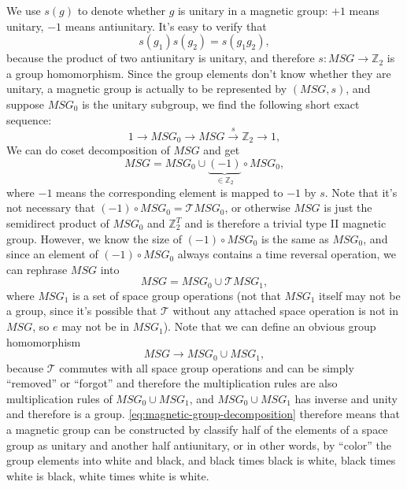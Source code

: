 \documentclass[hyperref, a4paper]{article}
\begin{document}
We use $s(g)$ to denote whether $g$ is unitary in a magnetic group: $+1$ means unitary, $-1$ means antiunitary.
It's easy to verify that 
\begin{equation}
    s(g_1) s(g_2) = s(g_1 g_2),
\end{equation}
because the product of two antiunitary is unitary, and therefore $s: MSG \to \mathbb{Z}_2$ is a 
group homomorphism. Since the group elements don't know whether they are unitary, a magnetic group 
is actually to be represented by $(MSG, s)$, and suppose $MSG_0$ is the unitary subgroup, 
we find the following short exact sequence: 
\begin{equation}
    1 \to MSG_0 \to MSG \stackrel{s}{\to} \mathbb{Z}_2 \to 1,
\end{equation}
We can do coset decomposition of $MSG$ and get 
\[
    MSG = MSG_0 \cup \underbrace{(-1)}_{\in \mathbb{Z}_2} \circ MSG_0,
\]
where $-1$ means the corresponding element is mapped to $-1$ by $s$. Note that it's not necessary that 
$(-1) \circ MSG_0 = \mathcal{T} MSG_0$, or otherwise $MSG$ is just the semidirect product of $MSG_0$ and 
$\mathbb{Z}_2^T$ and is therefore a trivial type II magnetic group. However, we know the size of $(-1) \circ MSG_0$ is the same as $MSG_0$, and since an element
of $(-1) \circ MSG_0$ always contains a time reversal operation, we can rephrase $MSG$ into 
\begin{equation}
    MSG = MSG_0 \cup \mathcal{T} MSG_1,
    \label{eq:magnetic-group-decomposition}
\end{equation}
where $MSG_1$ is a set of space group operations (not that $MSG_1$ itself may not be a group, since 
it's possible that $\mathcal{T}$ without any attached space operation is not in $MSG$, so $e$ may not be in 
$MSG_1$). Note that we can define an obvious group homomorphism 
\[
    MSG \to MSG_0 \cup MSG_1,
\]
because $\mathcal{T}$ commutes with all space group operations and can be simply ``removed'' or ``forgot'' and therefore 
the multiplication rules are also multiplication rules of $MSG_0 \cup MSG_1$, and $MSG_0 \cup MSG_1$ has 
inverse and unity and therefore is a group. \eqref{eq:magnetic-group-decomposition} therefore means that 
a magnetic group can be constructed by classify half of the elements of a space group as unitary and 
another half antiunitary, or in other words, by ``color'' the group elements into white and black, and 
black times black is white, black times white is black, white times white is white. 
\end{document}
